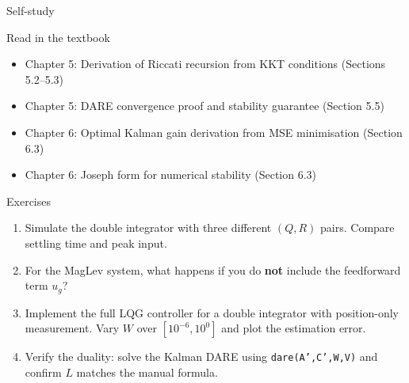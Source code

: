 \documentclass[aspectratio=169,11pt]{beamer}
\begin{document}
\begin{frame}[shrink=10]{Self-study}
\begin{block}{Read in the textbook}
\begin{itemize}
  \item Chapter 5: Derivation of Riccati recursion from KKT conditions (Sections 5.2--5.3)
  \item Chapter 5: DARE convergence proof and stability guarantee (Section 5.5)
  \item Chapter 6: Optimal Kalman gain derivation from MSE minimisation (Section 6.3)
  \item Chapter 6: Joseph form for numerical stability (Section 6.3)
\end{itemize}
\end{block}

\begin{block}{Exercises}
\begin{enumerate}
  \item Simulate the double integrator with three different $(Q, R)$ pairs.  Compare settling time and peak input.
  \item For the MagLev system, what happens if you do \textbf{not} include the feedforward term $u_g$?
  \item Implement the full LQG controller for a double integrator with position-only measurement.  Vary $W$ over $[10^{-6}, 10^{0}]$ and plot the estimation error.
  \item Verify the duality: solve the Kalman DARE using \texttt{dare(A',C',W,V)} and confirm $L$ matches the manual formula.
\end{enumerate}
\end{block}
\end{frame}
\end{document}
